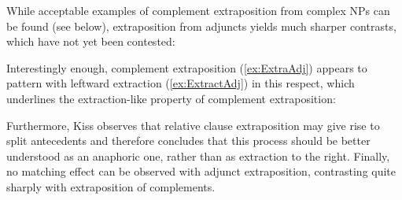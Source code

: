 \documentclass[output=paper
                ,modfonts
                ,nonflat
	        ,collection
	        ,collectionchapter
	        ,collectiontoclongg
 	        ,biblatex
                ,babelshorthands
                ,newtxmath
                ,draftmode
                ,colorlinks, citecolor=brown
]{./langsci/langscibook}
\begin{document}
{While acceptable examples of complement extraposition from complex NPs
can be found (see below), extraposition from adjuncts yields much
sharper contrasts, which have not yet been contested: 

\begin{exe}
  \ex
  \label{ex:ExtraAdj}
  \begin{xlist}

  \end{xlist}
\end{exe}


Interestingly enough, complement extraposition (\ref{ex:ExtraAdj}) appears to pattern with
leftward extraction (\ref{ex:ExtractAdj}) in this respect, which underlines the
extraction-like property of complement extraposition:

\begin{exe}
   \label{ex:ExtractAdj}
\end{exe}

Furthermore, Kiss observes that relative clause extraposition may give
rise to split antecedents and therefore concludes that this process
should be better understood as an anaphoric one, rather than as
extraction to the right. Finally, no matching effect can be observed
with adjunct extraposition, contrasting quite sharply with
extraposition of complements.


}
\end{document}
